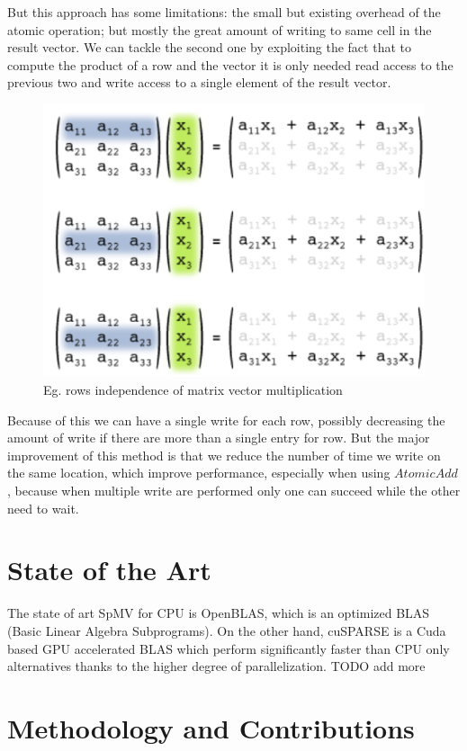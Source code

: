 \documentclass[conference]{IEEEtran}
\newcommand{\todo}[1]{\color{red} TODO #1\color{black}}
\begin{document}
But this approach has some limitations: the small but existing overhead of the atomic operation; but mostly the great amount of writing to same cell in the result vector. We can tackle the second one by exploiting the fact that to compute the product of a row and the vector it is only needed read access to the previous two and write access to a single element of the result vector.
\begin{figure}[h!]
	\centering
	\includegraphics[width=0.7\linewidth]{other_img/row-independence}
	\caption{Eg. rows independence of matrix vector multiplication  }
	\label{fig:row-independence}
\end{figure}

Because of this we can have a single write for each row, possibly decreasing the amount of write if there are more than a single entry for row. But the major improvement of this method is that we reduce the number of time we write on the same location, which improve performance, especially when using $AtomicAdd$, because when multiple write are performed only one can succeed while the other need to wait.

\section{State of the Art}
The state of art SpMV for CPU is OpenBLAS, which is an optimized BLAS (Basic Linear Algebra Subprograms). On the other hand, cuSPARSE is a Cuda based GPU accelerated BLAS which perform significantly faster than CPU only alternatives thanks to the higher degree of parallelization.
\todo{add more}

\section{Methodology and Contributions}\label{sec:methodology}
\end{document}
